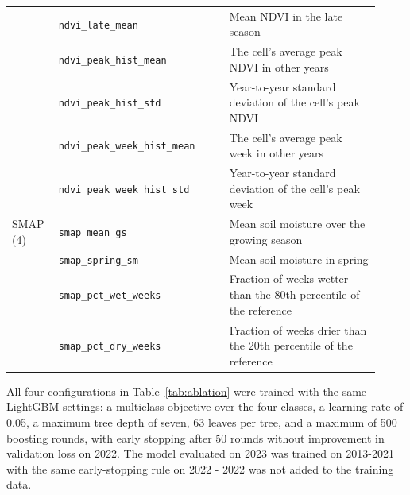 \documentclass[10pt,letterpaper]{article}
\begin{document}
{\begin{longtable}{@{}>{\raggedright\arraybackslash}p{0.11\linewidth}>{\raggedright\arraybackslash}p{0.43\linewidth}>{\raggedright\arraybackslash}p{0.38\linewidth}@{}}
& \texttt{ndvi\_late\_mean} & Mean NDVI in the late season \\

& \texttt{ndvi\_peak\_hist\_mean} & The cell's average peak NDVI in other years \\

& \texttt{ndvi\_peak\_hist\_std} & Year-to-year standard deviation of the cell's peak NDVI \\

& \texttt{ndvi\_peak\_week\_hist\_mean} & The cell's average peak week in other years \\

& \texttt{ndvi\_peak\_week\_hist\_std} & Year-to-year standard deviation of the cell's peak week \\

SMAP (4) & \texttt{smap\_mean\_gs} & Mean soil moisture over the growing season \\

& \texttt{smap\_spring\_sm} & Mean soil moisture in spring \\

& \texttt{smap\_pct\_wet\_weeks} & Fraction of weeks wetter than the 80th percentile of the reference \\

& \texttt{smap\_pct\_dry\_weeks} & Fraction of weeks drier than the 20th percentile of the reference \\

\end{longtable}}

All four configurations in Table~\ref{tab:ablation} were trained with the same LightGBM settings: a multiclass objective over the four classes, a learning rate of 0.05, a maximum tree depth of seven, 63 leaves per tree, and a maximum of 500 boosting rounds, with early stopping after 50 rounds without improvement in validation loss on 2022. The model evaluated on 2023 was trained on 2013-2021 with the same early-stopping rule on 2022 - 2022 was not added to the training data.
\end{document}
